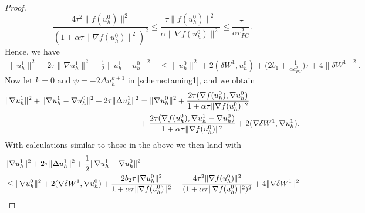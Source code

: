 \documentclass[reqno, 11pt]{amsart}
\theoremstyle{plain}
\theoremstyle{definition}
\theoremstyle{remark}
\numberwithin{equation}{section}
\numberwithin{theorem}{section}
\begin{document}
{\begin{proof}
\begin{equation}
\label{e:PC1}    
\frac{4\tau^2\|f(u_h^0)\|^2}{(1+\alpha\tau\|\nabla f(u_h^0)\|^2)^2}\leq \frac{\tau\|f(u_h^0)\|^2}{\alpha \|\nabla f(u_h^0)\|^2}\leq \frac{\tau}{\alpha c_{PC}^2}. 
\end{equation}
Hence,
we have
\begin{align}\label{eq:sta1}
\|u_h^1\|^2+2\tau\|\nabla u_h^1\|^2+\frac{1}{2}\|u_h^1-u_h^0\|^2
&\leq \|u_h^0\|^2
+2(\delta W^1, u_h^0)+\bigg(2b_1+\frac{1}{\alpha c_{PC}^2}\bigg)\tau+4\|\delta W^1\|^2.
\end{align}
Now let $k=0$ and $\psi=-2\Delta u_h^{k+1}$ in \eqref{scheme:taming1}, and we obtain
\begin{align}
\|\nabla u_h^1\|^2+\|\nabla u_h^1-\nabla u_h^0\|^2+2\tau\|\Delta u_h^1\|^2 & =\|\nabla u_h^0\|^2+\frac{2\tau(\nabla f(u_h^{0}), \nabla u_h^0)}{1+\alpha\tau \|\nabla f(u_h^0)\|^2}\notag\\
&+\frac{2\tau(\nabla f(u_h^{0}), \nabla u_h^1-\nabla u_h^0)}{1+\alpha\tau \|\nabla f(u_h^0)\|^2}+2(\nabla\delta W^1, \nabla u_h^1).
\end{align}
With calculations similar to those in the above we then land with
\begin{align}\label{eq:sta2}
&\|\nabla u_h^1\|^2+2\tau\|\Delta u_h^1\|^2+\frac{1}{2}\|\nabla u_h^1-\nabla u_h^0\|^2\notag\\
&\leq \|\nabla u_h^0\|^2
+2(\nabla \delta W^1, \nabla u_h^0)+\frac{2b_2\tau \|\nabla u_h^0\|^2}{1+\alpha\tau\|\nabla f(u_h^0)\|^2}
+\frac{4\tau^2\|\nabla f(u_h^0)\|^2}{(1+\alpha\tau\|\nabla f(u_h^0)\|^2)^2}+4\|\nabla \delta W^1\|^2\notag\\

\end{align}
\end{proof}}
\end{document}
